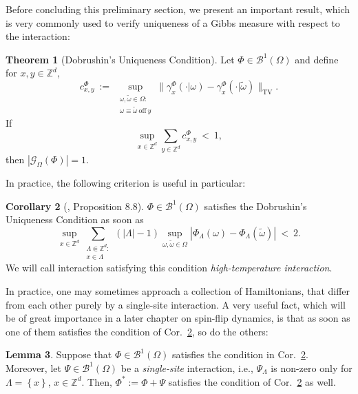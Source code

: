 \documentclass[12pt]{article}
\newcommand{\BB}{\mathscr{B}}
\newcommand{\G}{\mathcal{G}}
\newcommand{\Z}{\mathbb{Z}}
\newcommand{\TV}{\mathrm{TV}}
\newcommand{\set}[1]{\left\{#1\right\}}
\newcommand{\pika}{\boldsymbol{\cdot}}
\newcommand{\1}{\mathbbm{1}}
\newcommand{\5}{\vspace{0.5cm}}
\renewcommand{\tilde}{\widetilde}
\theoremstyle{definition}
\newtheorem{thm}{Theorem}[section]
\newtheorem{lem}[thm]{Lemma}
\newtheorem{cor}[thm]{Corollary}
\begin{document}
Before concluding this preliminary section, we present an important result, which is very commonly used to verify uniqueness of a Gibbs measure with respect to the interaction:
\begin{thm}[Dobrushin's Uniqueness Condition]\label{Dobrushin}
Let $\Phi\in\BB^1(\Omega)$ and define for $x,y\in\Z^d$,
$$c_{x,y}^\Phi ~:=~ \sup_{\substack{\omega,\tilde{\omega}\in\Omega:\\\omega\equiv\tilde{\omega}~\text{off}~ y}}\|\gamma_x^\Phi(\pika|\omega)-\gamma_x^\Phi(\pika|\tilde{\omega})\|_\TV.$$
If
$$\sup_{x\in\Z^d}\sum_{y\in\Z^d}c_{x,y}^\Phi ~<~ 1,$$
then $|\G_\Omega(\Phi)|=1$.
\end{thm}

In practice, the following criterion is useful in particular:

\begin{cor}[\cite{Geo}, Proposition 8.8]\label{DobCor}
$\Phi\in\BB^1(\Omega)$ satisfies the Dobrushin's Uniqueness Condition as soon as
$$\sup_{x\in\Z^d}\sum_{\substack{\Lambda\Subset\Z^d:\\x\in\Lambda}}(|\Lambda|-1)\sup_{\omega,\tilde{\omega}\in\Omega}|\Phi_\Lambda(\omega)-\Phi_\Lambda(\tilde{\omega})| ~<~ 2.$$
We will call interaction satisfying this condition \textit{high-temperature interaction}.
\end{cor}

In practice, one may sometimes approach a collection of Hamiltonians, that differ from each other purely by a single-site interaction. A very useful fact, which will be of great importance in a later chapter on spin-flip dynamics, is that as soon as one of them satisfies the condition of Cor.~\ref{DobCor}, so do the others:
\begin{lem}\label{DobLem}
Suppose that $\Phi\in\BB^1(\Omega)$ satisfies the condition in Cor.~\ref{DobCor}. Moreover, let $\Psi\in\BB^1(\Omega)$ be a \textit{single-site} interaction, i.e., $\Psi_\Lambda$ is non-zero only for $\Lambda=\set{x}$, $x\in\Z^d$. Then, $\Phi^*:=\Phi+\Psi$ satisfies the condition of Cor.~\ref{DobCor} as well.
\end{lem}
\end{document}
